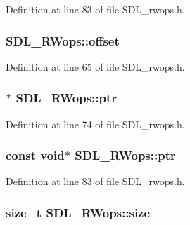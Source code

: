 Definition at line 83 of file S\-D\-L\-\_\-rwops.\-h.

\hypertarget{struct_s_d_l___r_wops_ab1ee9d9e4f61b3b30f26160c282ae416}{
\subsubsection[{offset}]{ S\-D\-L\-\_\-\-R\-Wops\-::offset}}\label{struct_s_d_l___r_wops_ab1ee9d9e4f61b3b30f26160c282ae416}


Definition at line 65 of file S\-D\-L\-\_\-rwops.\-h.

\hypertarget{struct_s_d_l___r_wops_a3f68b93789331775de802d51a2934f0a}{
\subsubsection[{ptr}]{$\ast$ S\-D\-L\-\_\-\-R\-Wops\-::ptr}}\label{struct_s_d_l___r_wops_a3f68b93789331775de802d51a2934f0a}


Definition at line 74 of file S\-D\-L\-\_\-rwops.\-h.

\hypertarget{struct_s_d_l___r_wops_a51baff579726790887a4ca41ce14873c}{
\subsubsection[{ptr}]{\setlength{\rightskip}{0pt plus 5cm}const {\bf void}$\ast$ S\-D\-L\-\_\-\-R\-Wops\-::ptr}}\label{struct_s_d_l___r_wops_a51baff579726790887a4ca41ce14873c}


Definition at line 83 of file S\-D\-L\-\_\-rwops.\-h.

\hypertarget{struct_s_d_l___r_wops_ab078bcf43a916d469ff550c60ab4b3f2}{
\subsubsection[{size}]{ {\bf size\-\_\-t} S\-D\-L\-\_\-\-R\-Wops\-::size}}\label{struct_s_d_l___r_wops_ab078bcf43a916d469ff550c60ab4b3f2}


